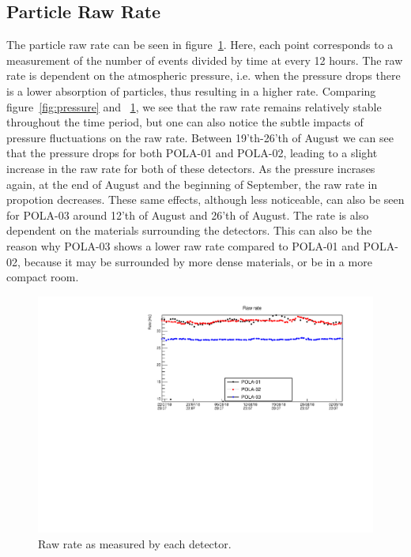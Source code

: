 \documentclass[12pt,a4paper]{amsart}
\begin{document}
\subsection{Particle Raw Rate}
The particle raw rate can be seen in figure~\ref{fig:RawRate}. Here, each point corresponds to a measurement of the number of events divided by time at every 12 hours. The raw rate is dependent on the atmospheric pressure, i.e. when the pressure drops there is a lower absorption of particles, thus resulting in a higher rate. Comparing figure~\ref{fig:pressure} and ~\ref{fig:RawRate}, we see that the raw rate remains relatively stable throughout the time period, but one can also notice the subtle impacts of pressure fluctuations on the raw rate. Between 19'th-26'th of August we can see that the pressure drops for both POLA-01 and POLA-02, leading to a slight increase in the raw rate for both of these detectors. As the pressure incrases again, at the end of August and the beginning of September, the raw rate in propotion decreases. These same effects, although less noticeable, can also be seen for POLA-03 around 12'th of August and 26'th of August. The rate is also dependent on the materials surrounding the detectors. This can also be the reason why POLA-03 shows a lower raw rate compared to POLA-01 and POLA-02, because it may be surrounded by more dense materials, or be in a more compact room.

\begin{figure}
	\centering
	\includegraphics[width=\textwidth]{../data/plots/RawRate_all.pdf}
	\caption{Raw rate as measured by each detector.}
	\label{fig:RawRate}
\end{figure}
\end{document}
